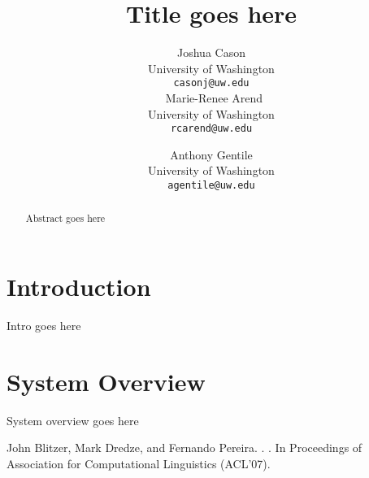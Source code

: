 \documentclass[11pt]{article}
\title{Title goes here}
\author{Joshua Cason \\
  University of Washington \\
  {\tt casonj@uw.edu} \\\,
  Marie-Renee Arend\\
  University of Washington \\
  {\tt rcarend@uw.edu} \\\and
  Anthony Gentile \\
  University of Washington \\
  {\tt agentile@uw.edu} \\}
\date{}
\begin{document}
\maketitle
\begin{abstract}
  Abstract goes here
\end{abstract}

\section{Introduction}

Intro goes here

\section{System Overview}

System overview goes here

\begin{thebibliography}{}

John Blitzer, Mark Dredze, and Fernando Pereira.
.
.
\newblock In Proceedings of Association for Computational Linguistics (ACL'07).

\end{thebibliography}
\end{document}
